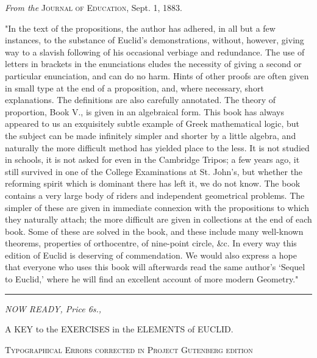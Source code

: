 \documentclass[oneside]{book}
\begin{document}
\begin{footnotesize}
\medskip
\begin{center}
\textit{From the} \textsc{Journal of Education}, Sept. 1, 1883.
\end{center}
\nopagebreak

"In the text of the propositions, the author has adhered, in all
but a few instances, to the substance of Euclid's demonstrations,
without, however, giving way to a slavish following of his occasional
verbiage and redundance. The use of letters in brackets
in the enunciations eludes the necessity of giving a second or
particular enunciation, and can do no harm. Hints of other
proofs are often given in small type at the end of a proposition,
and, where necessary, short explanations. The definitions are
also carefully annotated. The theory of proportion, Book V., is
given in an algebraical form. This book has always appeared to
us an exquisitely subtle example of Greek mathematical logic,
but the subject can be made infinitely simpler and shorter by a
little algebra, and naturally the more difficult method has yielded
place to the less. It is not studied in schools, it is not asked for
even in the Cambridge Tripos; a few years ago, it still survived
in one of the College Examinations at St. John's, but whether
the reforming spirit which is dominant there has left it, we do
not know. The book contains a very large body of riders and
independent geometrical problems. The simpler of these are
given in immediate connexion with the propositions to which
they naturally attach; the more difficult are given in collections
at the end of each book. Some of these are solved in the book,
and these include many well-known theorems, properties of orthocentre,
of nine-point circle, \&c. In every way this edition of
Euclid is deserving of commendation. We would also express a
hope that everyone who uses this book will afterwards read the
same author's `Sequel to Euclid,' where he will find an excellent
account of more modern Geometry."
\end{footnotesize}

\begin{center}

\rule[1ex]{3cm}{1pt}

\bigskip
\textit{\textsf{\large NOW READY, Price 6s.,}}

\bigskip
{\large A KEY to the EXERCISES in the ELEMENTS of
EUCLID.}
\end{center}

\newpage
\begin{center}\textsc{Typographical Errors corrected in Project Gutenberg edition}\end{center}
\end{document}
